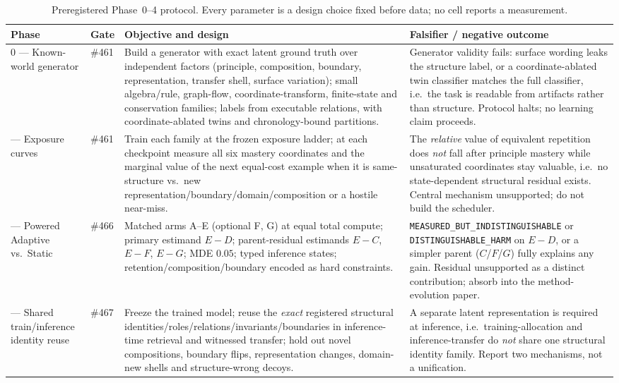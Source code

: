 \documentclass[11pt]{article}
\newcommand{\code}[1]{\texttt{#1}}
\begin{document}
\begin{table}[t]
\centering
\small
\caption{Preregistered Phase~0--4 protocol. Every parameter is a design choice fixed before data; no cell reports a measurement.}
\label{tab:phases}
\begin{tabularx}{\textwidth}{@{}p{2.05cm}p{1.55cm}YY@{}}
\toprule
\textbf{Phase} & \textbf{Gate} & \textbf{Objective and design} & \textbf{Falsifier / negative outcome} \\
 --- Known-world generator & \#461 & Build a generator with exact latent ground truth over independent factors (principle, composition, boundary, representation, transfer shell, surface variation); small algebra/rule, graph-flow, coordinate-transform, finite-state and conservation families; labels from executable relations, with coordinate-ablated twins and chronology-bound partitions. & Generator validity fails: surface wording leaks the structure label, or a coordinate-ablated twin classifier matches the full classifier, i.e.\ the task is readable from artifacts rather than structure. Protocol halts; no learning claim proceeds. \\
 --- Exposure curves & \#461 & Train each family at the frozen exposure ladder; at each checkpoint measure all six mastery coordinates and the marginal value of the next equal-cost example when it is same-structure vs.\ new representation/boundary/domain/composition or a hostile near-miss. & The \emph{relative} value of equivalent repetition does \emph{not} fall after principle mastery while unsaturated coordinates stay valuable, i.e.\ no state-dependent structural residual exists. Central mechanism unsupported; do not build the scheduler. \\
 --- Powered Adaptive vs.\ Static & \#466 & Matched arms A--E (optional F, G) at equal total compute; primary estimand $E-D$; parent-residual estimands $E-C$, $E-F$, $E-G$; MDE $0.05$; typed inference states; retention/composition/boundary encoded as hard constraints. & \code{MEASURED\_BUT\_INDISTINGUISHABLE} or \code{DISTINGUISHABLE\_HARM} on $E-D$, or a simpler parent ($C$/$F$/$G$) fully explains any gain. Residual unsupported as a distinct contribution; absorb into the method-evolution paper. \\
 --- Shared train/\allowbreak inference identity reuse & \#467 & Freeze the trained model; reuse the \emph{exact} registered structural identities/\allowbreak roles/\allowbreak relations/\allowbreak invariants/\allowbreak boundaries in inference-time retrieval and witnessed transfer; hold out novel compositions, boundary flips, representation changes, domain-new shells and structure-wrong decoys. & A separate latent representation is required at inference, i.e.\ training-allocation and inference-transfer do \emph{not} share one structural identity family. Report two mechanisms, not a unification. \\

\end{tabularx}
\end{table}
\end{document}
